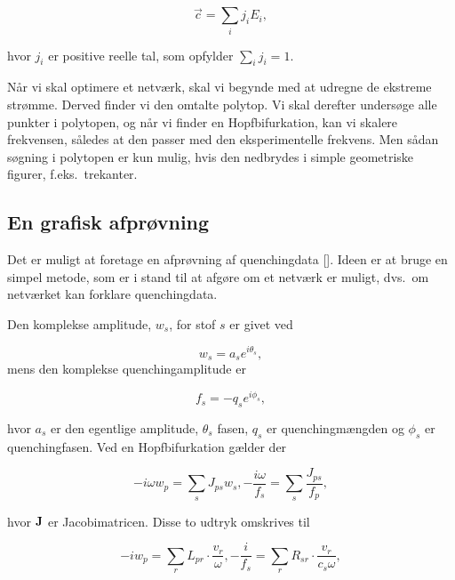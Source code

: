 \[
  \vec{c} = \sum_i j_i E_i,
\]

hvor $j_i$ er positive reelle tal, som opfylder $\sum_i j_i
=1$.

\vspace{4.0mm}
N{\aa}r vi skal optimere et netv{\ae}rk, skal vi begynde med
at udregne de ekstreme str{\o}mme. Derved finder vi den
omtalte polytop. Vi skal derefter unders{\o}ge alle punkter
i polytopen, og n{\aa}r vi finder en Hopfbifurkation, kan vi
skalere frekvensen, s{\aa}ledes at den passer med den
eksperimentelle frekvens. Men s{\aa}dan s{\o}gning i
polytopen er kun mulig, hvis den nedbrydes i simple
geometriske figurer, f.eks.\ trekanter.

\subsection{En grafisk afpr{\o}vning}
\label{clarke:test}
Det er muligt at foretage en afpr{\o}vning af quenchingdata [].
Ideen er at bruge en simpel metode, som er i stand til at
afg{\o}re om et netv{\ae}rk er muligt, dvs.\ om
netv{\ae}rket kan forklare quenchingdata.

\vspace{4.0mm}
Den komplekse amplitude, $w_s$, for stof $s$ er givet ved

\begin{equation}
  w_s = a_se^{i\theta_s},
\end{equation}
mens den komplekse quenchingamplitude er

\begin{equation}
  f_s = -q_se^{i\phi_s},
\end{equation}

hvor $a_s$ er den egentlige amplitude, $\theta_s$ fasen,
$q_s$ er quenchingm{\ae}ngden og $\phi_s$ er quenchingfasen.
Ved en Hopfbifurkation g{\ae}lder der

\begin{subequations}
  \begin{equation}
    -i\omega w_p = \sum_s J_{ps} w_s,
  \end{equation}
  
  \begin{equation}
    -\frac{i\omega}{f_s} = \sum_s \frac{J_{ps}}{f_p},
  \end{equation}
\end{subequations}

hvor $\mbox{${\bf J}$}$ er Jacobimatricen. Disse to udtryk
omskrives til

\begin{subequations}
  \begin{equation}
    -iw_p = \sum_r L_{pr}\cdot\frac{v_r}{\omega},
  \end{equation}

  \begin{equation}
    \label{clarke:10b}
    -\frac{i}{f_s} = \sum_r R_{sr}\cdot\frac{v_r}{c_s\omega},
  \end{equation}
\end{subequations}

